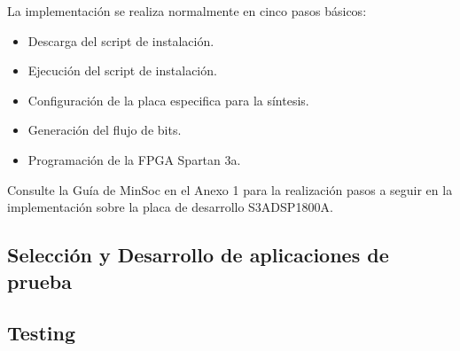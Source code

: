 La implementación se realiza normalmente en cinco pasos básicos: 
\begin {itemize}
\item Descarga del script de instalación.
\item Ejecución del script de instalación.
\item Configuración de la placa especifica para la síntesis.
\item Generación del flujo de bits.
\item Programación de la FPGA Spartan 3a.
 \end {itemize}
 Consulte la Guía de MinSoc en el Anexo 1 para la realización pasos a seguir en la implementación sobre la placa de desarrollo  S3ADSP1800A.


		

		\subsection{Selección y Desarrollo de aplicaciones de prueba}



		\subsection{Testing}


